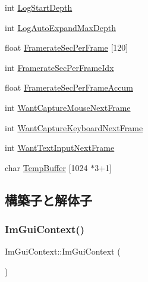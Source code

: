 \begin{DoxyCompactItemize}
\item 
int \mbox{\hyperlink{struct_im_gui_context_a6ac157821b3a0eb9d0411bc477df8665}{Log\+Start\+Depth}}
\item 
int \mbox{\hyperlink{struct_im_gui_context_a153d8c6eee2acdd3676ca55aec7b1079}{Log\+Auto\+Expand\+Max\+Depth}}
\item 
float \mbox{\hyperlink{struct_im_gui_context_aca772ab262c0094e8bbe7eae215fc23b}{Framerate\+Sec\+Per\+Frame}} \mbox{[}120\mbox{]}
\item 
int \mbox{\hyperlink{struct_im_gui_context_a64a96ad72dd7009dba134f6214a4936e}{Framerate\+Sec\+Per\+Frame\+Idx}}
\item 
float \mbox{\hyperlink{struct_im_gui_context_abcd18f2f8fedf0f45c3148b3e956e653}{Framerate\+Sec\+Per\+Frame\+Accum}}
\item 
int \mbox{\hyperlink{struct_im_gui_context_a7e7a9bbeaac9519abe29818ce6c2cc3b}{Want\+Capture\+Mouse\+Next\+Frame}}
\item 
int \mbox{\hyperlink{struct_im_gui_context_a0372056c72eac8b3e6de06c404caa5b3}{Want\+Capture\+Keyboard\+Next\+Frame}}
\item 
int \mbox{\hyperlink{struct_im_gui_context_abe551d35ea5c1aa61a4d5c785c8e0d9d}{Want\+Text\+Input\+Next\+Frame}}
\item 
char \mbox{\hyperlink{struct_im_gui_context_a875033fc5c10bc1e050f8701055ae93b}{Temp\+Buffer}} \mbox{[}1024 $\ast$3+1\mbox{]}
\end{DoxyCompactItemize}


\subsection{構築子と解体子}
\mbox{\label{struct_im_gui_context_a28776600467e31fcc353a8aedec727f1}} 
\subsubsection{\texorpdfstring{Im\+Gui\+Context()}{ImGuiContext()}}
{\footnotesize\ttfamily Im\+Gui\+Context\+::\+Im\+Gui\+Context (\begin{DoxyParamCaption}{ }\end{DoxyParamCaption})\hspace{0.3cm}{\ttfamily [inline]}}



